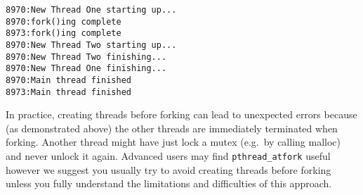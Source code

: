 \begin{Shaded}
\end{Shaded}

\begin{verbatim}
8970:New Thread One starting up...
8970:fork()ing complete
8973:fork()ing complete
8970:New Thread Two starting up...
8970:New Thread Two finishing...
8970:New Thread One finishing...
8970:Main thread finished
8973:Main thread finished
\end{verbatim}

In practice, creating threads before forking can lead to unexpected
errors because (as demonstrated above) the other threads are immediately
terminated when forking. Another thread might have just lock a mutex
(e.g.~by calling malloc) and never unlock it again. Advanced users may
find \texttt{pthread\_atfork} useful however we suggest you usually try
to avoid creating threads before forking unless you fully understand the
limitations and difficulties of this approach.

